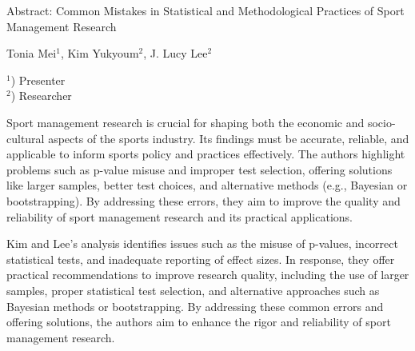 \documentclass[a4paper]{article}
\begin{document}

\Large
 \begin{center}
Abstract: Common Mistakes in Statistical and Methodological Practices of Sport Management Research\\ 

\hspace{10pt}

\large
 Tonia Mei$^1$, Kim Yukyoum$^2$, J. Lucy Lee$^2$ \\

\hspace{10pt}

\small  
$^1$) Presenter\\
$^2$) Researcher\\

\end{center}

\hspace{10pt}

\normalsize

Sport management research is crucial for shaping both the economic and socio-cultural aspects of the sports industry. Its findings must be accurate, reliable, and applicable to inform sports policy and practices effectively. The authors highlight problems such as p-value misuse and improper test selection, offering solutions like larger samples, better test choices, and alternative methods (e.g., Bayesian or bootstrapping). By addressing these errors, they aim to improve the quality and reliability of sport management research and its practical applications.

Kim and Lee’s analysis identifies issues such as the misuse of p-values, incorrect statistical tests, and inadequate reporting of effect sizes. In response, they offer practical recommendations to improve research quality, including the use of larger samples, proper statistical test selection, and alternative approaches such as Bayesian methods or bootstrapping. By addressing these common errors and offering solutions, the authors aim to enhance the rigor and reliability of sport management research.
\end{document}
